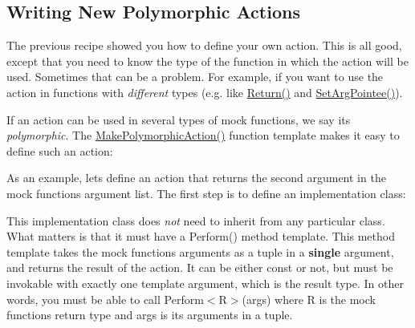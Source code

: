 \subsection*{Writing New Polymorphic Actions}

The previous recipe showed you how to define your own action. This is all good, except that you need to know the type of the function in which the action will be used. Sometimes that can be a problem. For example, if you want to use the action in functions with {\itshape different} types (e.\+g. like {\ttfamily \mbox{\hyperlink{namespacetesting_adae3994eb444d1ad2dd602454b854663}{Return()}}} and {\ttfamily \mbox{\hyperlink{namespacetesting_a6dbe77dc170c495ea300dd9d74ed4595}{Set\+Arg\+Pointee()}}}).

If an action can be used in several types of mock functions, we say it\textquotesingle{}s {\itshape polymorphic}. The {\ttfamily \mbox{\hyperlink{namespacetesting_a45df529b8166936d970884383f0ede82}{Make\+Polymorphic\+Action()}}} function template makes it easy to define such an action\+:


\begin{DoxyCode}{0}
\DoxyCodeLine{}
\DoxyCodeLine{}
\end{DoxyCode}


As an example, let\textquotesingle{}s define an action that returns the second argument in the mock function\textquotesingle{}s argument list. The first step is to define an implementation class\+:


\begin{DoxyCode}{0}
\DoxyCodeLine{  \}}
\DoxyCodeLine{\};}
\end{DoxyCode}


This implementation class does {\itshape not} need to inherit from any particular class. What matters is that it must have a {\ttfamily Perform()} method template. This method template takes the mock function\textquotesingle{}s arguments as a tuple in a {\bfseries{single}} argument, and returns the result of the action. It can be either {\ttfamily const} or not, but must be invokable with exactly one template argument, which is the result type. In other words, you must be able to call {\ttfamily Perform$<$R$>$(args)} where {\ttfamily R} is the mock function\textquotesingle{}s return type and {\ttfamily args} is its arguments in a tuple.

